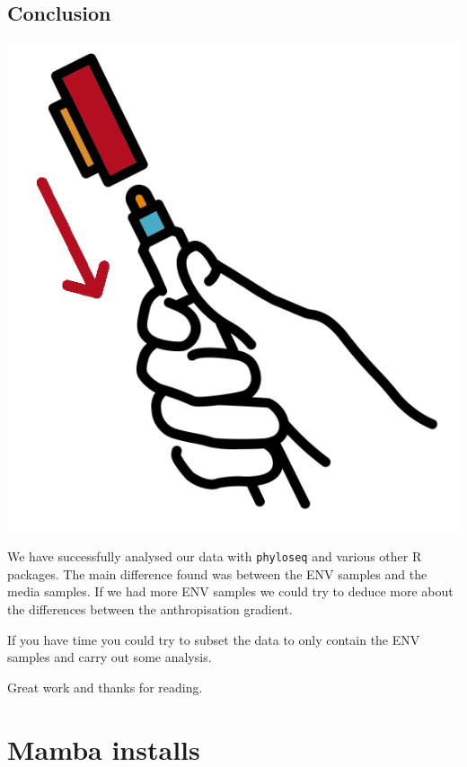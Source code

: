 \documentclass[
]{book}
\begin{document}
\hypertarget{conclusion}{%
\section{Conclusion}\label{conclusion}}

\includegraphics{figures/recap.png}

We have successfully analysed our data with \texttt{phyloseq} and various other R packages.
The main difference found was between the ENV samples and the media samples.
If we had more ENV samples we could try to deduce more about the differences between the anthropisation gradient.

If you have time you could try to subset the data to only contain the ENV samples and carry out some analysis.

Great work and thanks for reading.

\hypertarget{appendix-appendix}{%
\appendix}


\hypertarget{mambainstalls}{%
\chapter{Mamba installs}\label{mambainstalls}}
\end{document}
